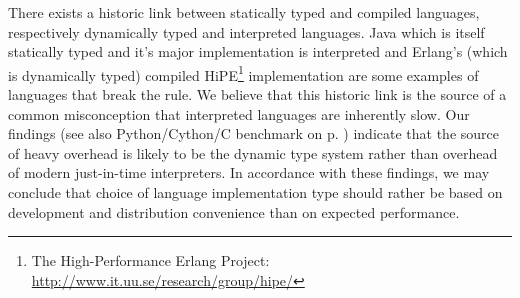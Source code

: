 There exists a historic link between statically typed and compiled languages, respectively
dynamically typed and interpreted languages. Java which is itself statically typed and it's major
implementation is interpreted and Erlang's (which is dynamically typed) compiled
HiPE\footnote{The High-Performance Erlang Project: \url{http://www.it.uu.se/research/group/hipe/}}
implementation are some examples of languages that break the rule. We believe that this historic
link is the source of a common misconception that interpreted languages are inherently slow. Our
findings (see also Python/Cython/C benchmark on p. \pageref{sec:CythonPerformace}) indicate that
the source of heavy overhead is likely to be the dynamic type system rather than overhead of modern
just-in-time interpreters. In accordance with these findings, we may conclude that choice of language
implementation type should rather be based on development and distribution convenience than on
expected performance. %

